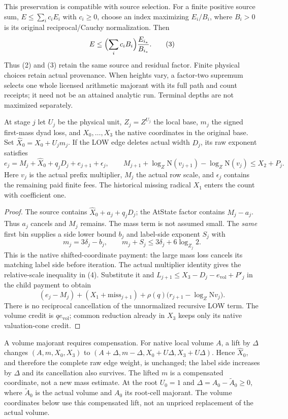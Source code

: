 \documentclass[10pt,a4paper]{article}
\newcommand{\N}{\mathrm N}\newcommand{\E}{\mathcal E}
\begin{document}
This preservation is compatible with source selection. For a finite positive
source sum, $E\le\sum_i c_iE_i$ with $c_i\ge0$, choose an index maximizing
$E_i/B_i$, where $B_i>0$ is its original reciprocal/Cauchy normalization.
Then
\[
 E\le\Bigl(\sum_i c_iB_i\Bigr)\frac{E_{i_*}}{B_{i_*}}. \tag{3}
\]
Thus (2) and (3) retain the same source and residual factor. Finite physical
choices retain actual provenance. When heights vary, a factor-two supremum
selects one whole licensed arithmetic majorant with its full path and count
receipts; it need not be an attained analytic run. Terminal depths are not
maximized separately.

\begin{lemma}\label{lem:raw}
At stage $j$ let $U_j$ be the physical unit, $Z_j=Z^{U_j}$ the local base,
$m_j$ the signed first-mass dyad loss, and $X_0,\ldots,X_3$ the native
coordinates in the original base. Set $\widehat X_0=X_0+U_jm_j$.
If the LOW edge deletes actual width $D_j$, its raw exponent satisfies
\[
 e_j=M_j+\widehat X_0+q_jD_j+e_{j+1}+\epsilon_j,\qquad
 M_{j+1}+\log_Z\N(v_{j+1})-\log_Z\N(v_j)\le X_2+P_j. \tag{4}
\]
Here $v_j$ is the actual prefix multiplier, $M_j$ the actual row scale, and
$\epsilon_j$ contains the remaining paid finite fees. The historical missing
radical $X_1$ enters the count with coefficient one.
\end{lemma}
\begin{proof}
The source contains $\widehat X_0+a_j+q_jD_j$; the AtState factor contains
$M_j-a_j$. Thus $a_j$ cancels and $M_j$ remains. The mass term is not
assumed small. The \emph{same} first bin supplies a side lower bound $b_j$
and label-side exponent $S_j$ with
\[
 m_j=3\delta_j-b_j,\qquad m_j+S_j\le3\delta_j+6\log_{Z_j}2.
\]
This is the native shifted-coordinate payment: the large mass loss cancels
its matching label side before iteration. The actual multiplier identity
gives the relative-scale inequality in (4). Substitute it and
$L_{j+1}\le X_3-D_j-e_{\mathrm{vol}}+P'_j$ in the child payment to obtain
\[
 (e_j-M_j)+(X_1+\mathrm{miss}_{j+1})
       +\rho(q)\bigl(r_{j+1}-\log_Z\N v_j\bigr).
\]
There is no reciprocal cancellation of the unnormalized recursive LOW term.
The volume credit is $q e_{\mathrm{vol}}$; common reduction already in $X_3$
keeps only its native valuation-cone credit.
\end{proof}

A volume majorant requires compensation. For native local volume $A$, a lift
by $\Delta$ changes $(A,m,X_0,X_3)$ to
$(A+\Delta,m-\Delta,X_0+U\Delta,X_3+U\Delta)$.
Hence $\widehat X_0$, and therefore the complete raw edge weight, is unchanged;
the label side increases by $\Delta$ and its cancellation also survives.
The lifted $m$ is a compensated coordinate, not a new mass estimate.
At the root $U_0=1$ and $\Delta=A_0-\widetilde A_0\ge0$, where
$\widetilde A_0$ is the actual volume and $A_0$ its root-cell majorant.
The volume coordinates below use this compensated lift, not an unpriced
replacement of the actual volume.
\end{document}
